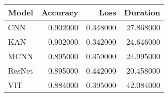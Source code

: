\begin{tabular}{lrrr}
\toprule
Model & Accuracy & Loss & Duration \\
\midrule
CNN & 0.902000 & 0.348000 & 27.868000 \\
KAN & 0.902000 & 0.342000 & 24.646000 \\
MCNN & 0.895000 & 0.359000 & 24.995000 \\
ResNet & 0.895000 & 0.442000 & 20.458000 \\
VIT & 0.884000 & 0.395000 & 42.084000 \\
\bottomrule
\end{tabular}
